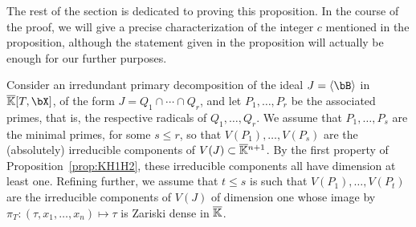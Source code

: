 \documentclass[12pt]{article}
\begin{document}
The rest of the section is dedicated to proving this proposition.
In the course of the proof, we will give a precise characterization of
the integer $c$ mentioned in the proposition, although the statement
given in the proposition will actually be enough for our further
purposes.

Consider an irredundant primary decomposition of the ideal $J=\langle
\bB\rangle$ in $\KKbar[T,\bX]$, of the form $J=Q_1 \cap \cdots \cap
Q_r$, and let $P_1,\dots,P_r$ be the associated primes, that is, the
respective radicals of $Q_1,\dots,Q_r$. We assume that $P_1,\dots,P_s$
are the minimal primes, for some $s \le r$, so that
$V(P_1),\dots,V(P_s)$ are the (absolutely) irreducible components of
$V(J)\subset \overline{\mathbb{K}}{}^{n+1}$. By the first property of
Proposition~\ref{prop:KH1H2}, these irreducible components all have
dimension at least one. Refining further, we assume that $t \le s$ is
such that $V(P_1),\dots,V(P_t)$ are the irreducible components of
$V(J)$ of dimension one whose image by $\pi_T: (\tau,x_1,\dots,x_n)
\mapsto \tau$ is Zariski dense in $\overline{\mathbb{K}}$.
\end{document}
